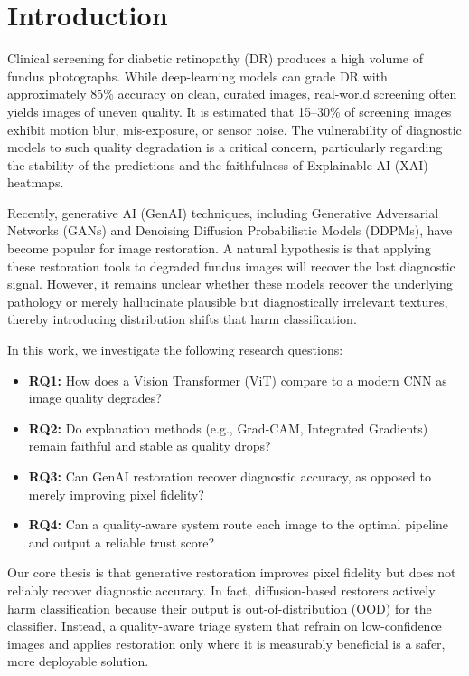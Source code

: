 \documentclass[runningheads]{llncs}
\begin{document}
\section{Introduction}
Clinical screening for diabetic retinopathy (DR) produces a high volume of fundus photographs. While deep-learning models can grade DR with approximately 85\% accuracy on clean, curated images, real-world screening often yields images of uneven quality. It is estimated that 15--30\% of screening images exhibit motion blur, mis-exposure, or sensor noise. The vulnerability of diagnostic models to such quality degradation is a critical concern, particularly regarding the stability of the predictions and the faithfulness of Explainable AI (XAI) heatmaps.

Recently, generative AI (GenAI) techniques, including Generative Adversarial Networks (GANs) and Denoising Diffusion Probabilistic Models (DDPMs), have become popular for image restoration. A natural hypothesis is that applying these restoration tools to degraded fundus images will recover the lost diagnostic signal. However, it remains unclear whether these models recover the underlying pathology or merely hallucinate plausible but diagnostically irrelevant textures, thereby introducing distribution shifts that harm classification.

In this work, we investigate the following research questions:
\begin{itemize}
    \item \textbf{RQ1:} How does a Vision Transformer (ViT) compare to a modern CNN as image quality degrades?
    \item \textbf{RQ2:} Do explanation methods (e.g., Grad-CAM, Integrated Gradients) remain faithful and stable as quality drops?
    \item \textbf{RQ3:} Can GenAI restoration recover diagnostic accuracy, as opposed to merely improving pixel fidelity?
    \item \textbf{RQ4:} Can a quality-aware system route each image to the optimal pipeline and output a reliable trust score?
\end{itemize}

Our core thesis is that generative restoration improves pixel fidelity but does not reliably recover diagnostic accuracy. In fact, diffusion-based restorers actively harm classification because their output is out-of-distribution (OOD) for the classifier. Instead, a quality-aware triage system that refrain on low-confidence images and applies restoration only where it is measurably beneficial is a safer, more deployable solution.
\end{document}

